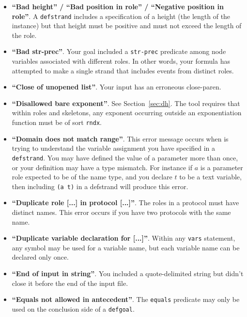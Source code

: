 \begin{itemize}
\item \textbf{``Bad height'' / ``Bad position in role'' / ``Negative
  position in role''}.  A \texttt{defstrand} includes a specification
  of a height (the length of the instance) but that height must be
  positive and must not exceed the length of the role.

\item \textbf{``Bad str-prec''}.  Your goal included a
  \texttt{str-prec} predicate among node variables associated with
  different roles.  In other words, your formula has attempted to make
  a single strand that includes events from distinct roles.

\item \textbf{``Close of unopened list''}.  Your input has an erroneous
  close-paren.

\item \textbf{``Disallowed bare exponent''}.  See
  Section~\ref{sec:dh}.  The tool requires that within roles and
  skeletons, any exponent occurring outside an exponentiation
  function must be of sort \texttt{rndx}.

\item \textbf{``Domain does not match range''}.  This error message
  occurs when {\cpsa} is trying to understand the variable assignment
  you have specified in a \texttt{defstrand}.  You may have defined
  the value of a parameter more than once, or your definition may have
  a type mismatch.  For instance if $a$ is a parameter role expected
  to be of the name type, and you declare $t$ to be a text variable,
  then including \texttt{(a t)} in a defstrand will produce this
  error.

\item \textbf{``Duplicate role [...] in protocol [...]''}.  The roles
  in a protocol must have distinct names.  This error occurs if you
  have two protocols with the same name.

\item \textbf{``Duplicate variable declaration for [...]''}.  Within
  any \texttt{vars} statement, any symbol may be used for a variable
  name, but each variable name can be declared only once.

\item \textbf{``End of input in string''}.  You included a quote-delimited
  string but didn't close it before the end of the input file.

\item \textbf{``Equals not allowed in antecedent''}.  The \texttt{equals}
  predicate may only be used on the conclusion side of a \texttt{defgoal}.


\end{itemize}
